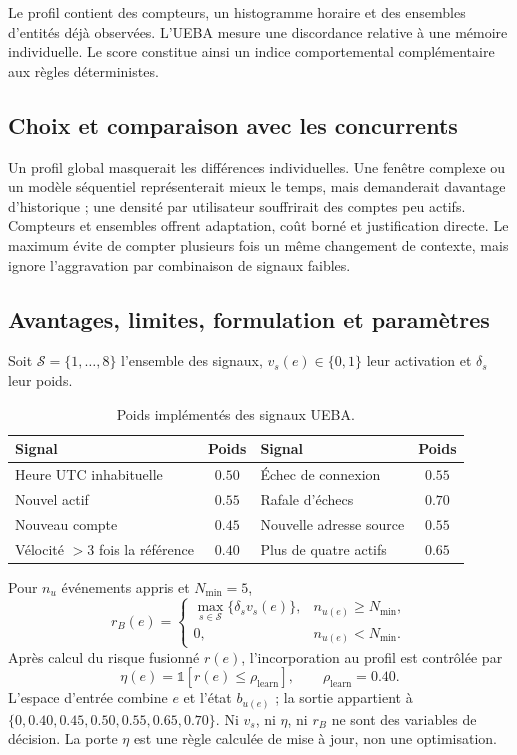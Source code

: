 \documentclass[11pt,a4paper,oneside]{report}
\theoremstyle{definition}
\theoremstyle{plain}
\begin{document}
Le profil contient des compteurs, un histogramme horaire et des ensembles d'entités
déjà observées. L'UEBA mesure une discordance relative à une mémoire individuelle.
Le score constitue ainsi un indice comportemental complémentaire aux règles
déterministes.

\subsection*{Choix et comparaison avec les concurrents}

Un profil global masquerait les différences individuelles. Une fenêtre complexe ou un modèle séquentiel représenterait mieux le temps, mais demanderait davantage d'historique ; une densité par utilisateur souffrirait des comptes peu actifs. Compteurs et ensembles offrent adaptation, coût borné et justification directe. Le maximum évite de compter plusieurs fois un même changement de contexte, mais ignore l'aggravation par combinaison de signaux faibles.

\subsection*{Avantages, limites, formulation et paramètres}

Soit $\mathcal{S}=\{1,\ldots,8\}$ l'ensemble des signaux, $v_s(e)\in\{0,1\}$ leur activation et $\delta_s$ leur poids.
\begin{table}[H]
\centering
\caption{Poids implémentés des signaux UEBA.}
\label{tab:ai-ro-ueba-weights}
\small
\begin{tabular}{@{}lc@{\qquad}lc@{}}
\toprule
Signal & Poids & Signal & Poids\\
\midrule
Heure UTC inhabituelle & $0.50$ & Échec de connexion & $0.55$\\
Nouvel actif & $0.55$ & Rafale d'échecs & $0.70$\\
Nouveau compte & $0.45$ & Nouvelle adresse source & $0.55$\\
Vélocité $>3$ fois la référence & $0.40$ & Plus de quatre actifs & $0.65$\\
\bottomrule
\end{tabular}
\end{table}

Pour $n_u$ événements appris et $N_{\min}=5$,
\begin{equation}
r_B(e)=
\begin{cases}
\max_{s\in\mathcal{S}}\{\delta_sv_s(e)\},&n_{u(e)}\geq N_{\min},\\
0,&n_{u(e)}<N_{\min}.
\end{cases}
\label{eq:ai-ro-ueba}
\end{equation}
Après calcul du risque fusionné $r(e)$, l'incorporation au profil est contrôlée par
\begin{equation}
\eta(e)=\mathbb{1}[r(e)\leq\rho_{\mathrm{learn}}],
\qquad \rho_{\mathrm{learn}}=0.40.
\label{eq:ai-ro-learning-gate}
\end{equation}
L'espace d'entrée combine $e$ et l'état $b_{u(e)}$ ; la sortie appartient à
$\{0,0.40,0.45,0.50,0.55,0.65,0.70\}$. Ni $v_s$, ni $\eta$, ni $r_B$ ne sont des variables de décision. La porte $\eta$ est une règle calculée de mise à jour, non une optimisation.
\end{document}
